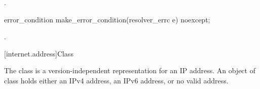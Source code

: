 \begin{itemdescr}
\pnum
\returns {}.
\end{itemdescr}

%
%
\begin{itemdecl}
error_condition make_error_condition(resolver_errc e) noexcept;
\end{itemdecl}

\begin{itemdescr}
\pnum
\returns {}.
\end{itemdescr}



[internet.address]{Class }

\pnum
The class  is a version-independent representation for an IP address. An object of class  holds either an IPv4 address, an IPv6 address, or no valid address.

